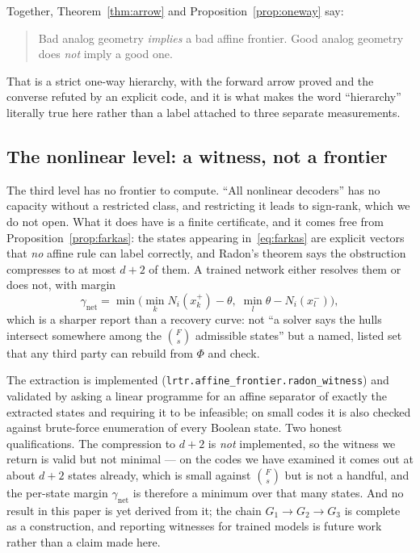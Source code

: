 \documentclass[preprint,12pt]{elsarticle}
\theoremstyle{definition}
\newcommand{\code}[1]{\texttt{\small #1}}
\begin{document}
Together, Theorem~\ref{thm:arrow} and Proposition~\ref{prop:oneway} say:

\begin{quote}
Bad analog geometry \emph{implies} a bad affine frontier. Good analog geometry does \emph{not}
imply a good one.
\end{quote}

That is a strict one-way hierarchy, with the forward arrow proved and the converse refuted by an
explicit code, and it is what makes the word ``hierarchy'' literally true here rather than a
label attached to three separate measurements.

\subsection{The nonlinear level: a witness, not a frontier}
\label{sec:witness}

The third level has no frontier to compute. ``All nonlinear decoders'' has no capacity without a
restricted class, and restricting it leads to sign-rank, which we do not open. What it does have
is a finite certificate, and it comes free from Proposition~\ref{prop:farkas}: the states
appearing in~\eqref{eq:farkas} are explicit vectors that \emph{no} affine rule can label
correctly, and Radon's theorem says the obstruction compresses to at most $d+2$ of them. A
trained network either resolves them or does not, with margin
\[
  \gamma_{\mathrm{net}}
  =\min\Big(\min_k N_i(x^{+}_k)-\theta,\;\min_l\theta-N_i(x^{-}_l)\Big),
\]
which is a sharper report than a recovery curve: not ``a solver says the hulls intersect
somewhere among the $\binom{F}{s}$ admissible states'' but a named, listed set that any third
party can rebuild from $\Phi$ and check.

The extraction is implemented (\code{lrtr.affine\_frontier.radon\_witness}) and validated by
asking a linear programme for an affine separator of exactly the extracted states and requiring
it to be infeasible; on small codes it is also checked against brute-force enumeration of every
Boolean state. Two honest qualifications. The compression to $d+2$ is \emph{not} implemented, so
the witness we return is valid but not minimal --- on the codes we have examined it comes out at
about $d+2$ states already, which is small against $\binom{F}{s}$ but is not a handful, and the
per-state margin $\gamma_{\mathrm{net}}$ is therefore a minimum over that many states. And no
result in this paper is yet derived from it; the chain
$G_1\to G_2\to G_3$ is complete as a construction, and reporting witnesses for trained models is
future work rather than a claim made here.
\end{document}
